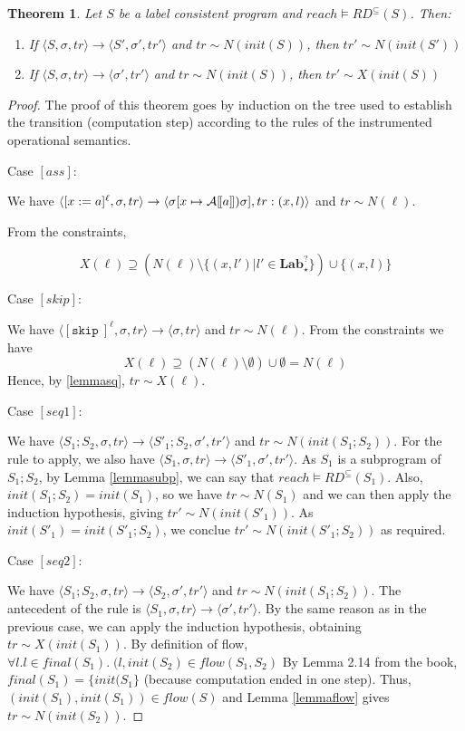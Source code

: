 \documentclass[a4wide,12pt]{article}
\theoremstyle{definition}
\theoremstyle{plain}
\newtheorem{theo}{Theorem}
\theoremstyle{remark}
\def\A#1{\mathcal{A}[\hspace{-1pt}[#1]\hspace{-1pt}])}
\def\const#1{\mathopen{\langle}#1\mathclose{\rangle}} %
\def\pair#1{\const{#1}}
\def\Lab {\mathbf{Lab}}
\def\skip {\texttt{skip}\ }
\begin{document}
\begin{theo}
Let $S$ be a label consistent program and $reach \models RD^{\subseteq}(S)$. Then:
\begin{enumerate}
\item If $\pair{S,\sigma, tr} \to \pair{S', \sigma', tr'}$ and $tr \sim N(init(S))$, then $tr' \sim N(init(S'))$
\item If $\pair{S,\sigma, tr} \to \pair{\sigma', tr'}$ and $tr \sim N(init(S))$, then $tr' \sim X(init(S))$
\end{enumerate}
\end{theo}
\begin{proof}
The proof of this theorem goes by induction on the tree used to establish
the transition (computation step) according to the rules of the instrumented operational semantics.

Case $[ass]$:

We have $\pair{[x := a]^\ell, \sigma, tr} \to \pair{\sigma[x\mapsto\A{a}\sigma], tr:(x,l)}$
and $tr \sim N(\ell)$. 


From the constraints,


\[X(\ell) \supseteq (N(\ell) \setminus \{(x,l')|l' \in \Lab_\star^?\}) \cup \{(x,l)\}\]




Case $[skip]$:

We have $\pair{[\skip]^\ell, \sigma, tr} \to \pair{\sigma, tr}$
and $tr \sim N(\ell)$. 
From the constraints we have
\[X(\ell) \supseteq (N(\ell) \setminus \emptyset) \cup \emptyset = N(\ell)\]
Hence, by \ref{lemmasq}, $tr \sim X(\ell)$.

Case $[seq1]$:

We have $\pair{S_1;S_2,\sigma,tr} \to \pair{S'_1;S_2,\sigma',tr'}$ and $tr \sim N(init(S_1;S_2))$.
For the rule to apply, we also have $\pair{S_1,\sigma,tr} \to \pair{S'_1,\sigma',tr'}$.
As $S_1$ is a subprogram of $S_1;S_2$, by Lemma \ref{lemmasubp},
we can say that $reach \models RD^{\subseteq}(S_1)$. Also, $init(S_1;S_2) = init(S_1)$, so we have
$tr \sim N(S_1)$ and we can then apply the induction hypothesis, giving $tr' \sim  N(init(S'_1))$.
As $init(S'_1) = init(S'_1;S_2)$, we conclue $tr' \sim N(init(S'_1;S_2))$ as required.

Case $[seq2]$:

We have $\pair{S_1;S_2,\sigma,tr} \to \pair{S_2,\sigma',tr'}$ and $tr \sim N(init(S_1;S_2))$.
The antecedent of the rule is $\pair{S_1,\sigma,tr} \to \pair{\sigma',tr'}$.
By the same reason as in the previous case, we can apply the induction hypothesis, obtaining
$tr \sim X(init(S_1))$. By definition of flow, $\forall l. l \in final(S_1). \;(l,init(S_2) \in flow(S_1,S_2)$
By Lemma 2.14 from the book, $final(S_1) = \{init(S_1\}$ (because computation ended in one step). Thus,
$(init(S_1),init(S_1)) \in flow(S)$ and Lemma \ref{lemmaflow} gives $tr \sim N(init(S_2))$.


\end{proof}
\end{document}
